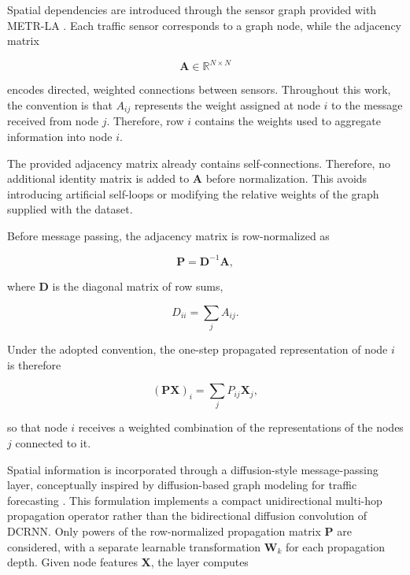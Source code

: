 Spatial dependencies are introduced through the sensor graph provided with
METR-LA \citep{li2018dcrnn}. Each traffic sensor corresponds to a graph node, while the adjacency
matrix

\begin{equation}
    \mathbf{A} \in \mathbb{R}^{N \times N}
\end{equation}

encodes directed, weighted connections between sensors. Throughout this work,
the convention is that $A_{ij}$ represents the weight assigned at node $i$
to the message received from node $j$. Therefore, row $i$ contains the
weights used to aggregate information into node $i$.

The provided adjacency matrix already contains self-connections. Therefore,
no additional identity matrix is added to $\mathbf{A}$ before normalization.
This avoids introducing artificial self-loops or modifying the relative
weights of the graph supplied with the dataset.

Before message passing, the adjacency matrix is row-normalized as

\begin{equation}
    \mathbf{P} = \mathbf{D}^{-1}\mathbf{A},
    \label{eq:row_normalization}
\end{equation}

where $\mathbf{D}$ is the diagonal matrix of row sums,

\begin{equation}
    D_{ii} = \sum_j A_{ij}.
\end{equation}

Under the adopted convention, the one-step propagated representation of node
$i$ is therefore

\begin{equation}
    (\mathbf{P}\mathbf{X})_i
    =
    \sum_j P_{ij}\mathbf{X}_j,
    \label{eq:graph_aggregation}
\end{equation}

so that node $i$ receives a weighted combination of the representations of
the nodes $j$ connected to it.

Spatial information is incorporated through a diffusion-style message-passing
layer, conceptually inspired by diffusion-based graph modeling for traffic
forecasting \citep{li2018dcrnn}.
This formulation implements a compact unidirectional multi-hop propagation
operator rather than the bidirectional diffusion convolution of DCRNN.
Only powers of the row-normalized propagation matrix $\mathbf{P}$ are
considered, with a separate learnable transformation $\mathbf{W}_k$ for
each propagation depth.
Given node features $\mathbf{X}$, the layer computes

